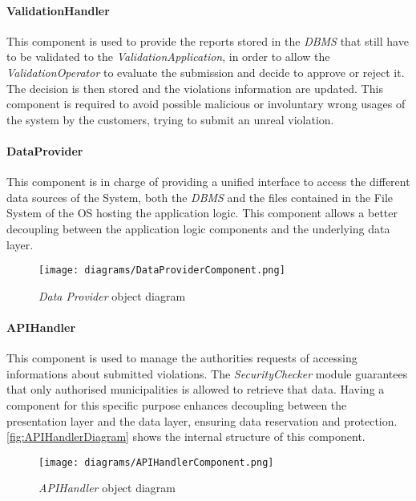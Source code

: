 \paragraph{ValidationHandler}
This component is used to provide the reports stored in the \textit{DBMS} that still have to be validated to the \textit{ValidationApplication}, in order to allow the \textit{ValidationOperator} to evaluate the submission and decide to approve or reject it. The decision is then stored and the violations information are updated. This component is required to avoid possible malicious or involuntary wrong usages of the system by the customers, trying to submit an unreal violation.
\paragraph{DataProvider}
This component is in charge of providing a unified interface to access the different data sources of the System, both the \textit{DBMS} and the files contained in the File System of the OS hosting the application logic. This component allows a better decoupling between the application logic components and the underlying data layer. \newline\newline\newline

\begin{figure}[h!]
	\centering
	\texttt{[image: diagrams/DataProviderComponent.png]}
	\caption{
		\label{fig:dataProviderComponentDiagram} 
		\emph{Data Provider} object diagram
	}
\end{figure}

\clearpage

\paragraph{APIHandler}
This component is used to manage the authorities requests of accessing informations about submitted violations. The \textit{SecurityChecker} module guarantees that only authorised municipalities is allowed to retrieve that data. Having a component for this specific purpose enhances decoupling between the presentation layer and the data layer, ensuring data reservation and protection. \autoref{fig:APIHandlerDiagram} shows the internal structure of this component.\newline\newline
\begin{figure}[h!]
	\centering
	\texttt{[image: diagrams/APIHandlerComponent.png]}
	\caption{
		\label{fig:APIHandlerDiagram} 
		\emph{APIHandler} object diagram
	}
\end{figure}

